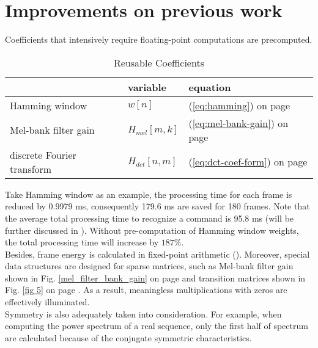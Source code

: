 
\section{Improvements on previous work}

Coefficients that intensively require floating-point computations are precomputed.

\begin{table}[H]
\centering
\caption{Reusable Coefficients}
\begin{tabu} to \textwidth {XXX}
\toprule
&variable &equation\\
\hline
Hamming window &$w[n]$ &(\ref{eq:hamming}) on page \pageref{eq:hamming}\\
\hline
Mel-bank filter gain &$H_{mel}[m, k]$ &(\ref{eq:mel-bank-gain}) on page \pageref{eq:mel-bank-gain}\\
\hline
discrete Fourier transform &$H_{dct}[n, m]$ &(\ref{eq:dct-coef-form}) on page \pageref{eq:dct-coef-form}\\
\bottomrule
\end{tabu}
\end{table}

Take Hamming window as an example, the processing time for each frame is reduced by 0.9979 ms, consequently 179.6 ms are saved for 180 frames. Note that the average total processing time to recognize a command is 95.8 ms (will be further discussed in ). Without pre-computation of Hamming window weights, the total processing time will increase by $187\%$.\\

Besides, frame energy is calculated in fixed-point arithmetic (). Moreover, special data structures are designed for sparse matrices, such as Mel-bank filter gain shown in Fig. \ref{mel_filter_bank_gain} on page \pageref{mel_filter_bank_gain} and transition matrices shown in Fig. \ref{fig 5} on page \pageref{fig 5}. As a result, meaningless multiplications with zeros are effectively illuminated.\\

Symmetry is also adequately taken into consideration. For example, when computing the power spectrum of a real sequence, only the first half of spectrum are calculated because of the conjugate symmetric characteristics.

